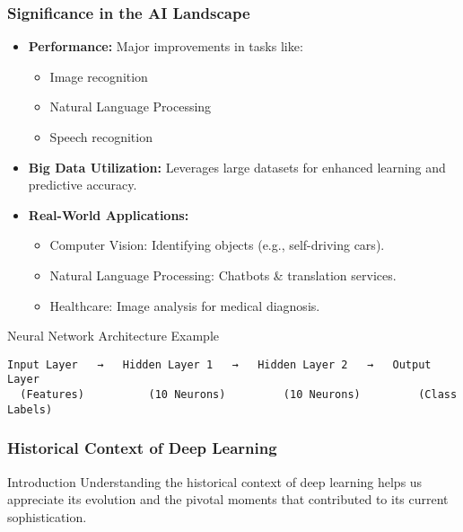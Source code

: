 \documentclass[aspectratio=169]{beamer}
\begin{document}
\begin{frame}[fragile]
    \frametitle{Significance in the AI Landscape}
    \begin{itemize}
        \item \textbf{Performance:} Major improvements in tasks like:
            \begin{itemize}
                \item Image recognition
                \item Natural Language Processing
                \item Speech recognition
            \end{itemize}
        \item \textbf{Big Data Utilization:} Leverages large datasets for enhanced learning and predictive accuracy.
        \item \textbf{Real-World Applications:}
            \begin{itemize}
                \item Computer Vision: Identifying objects (e.g., self-driving cars).
                \item Natural Language Processing: Chatbots \& translation services.
                \item Healthcare: Image analysis for medical diagnosis.
            \end{itemize}
    \end{itemize}

    \begin{block}{Neural Network Architecture Example}
    \begin{lstlisting}
Input Layer   →   Hidden Layer 1   →   Hidden Layer 2   →   Output Layer
  (Features)          (10 Neurons)         (10 Neurons)         (Class Labels)
    \end{lstlisting}
    \end{block}
\end{frame}

\begin{frame}[fragile]
    \frametitle{Historical Context of Deep Learning}
    \begin{block}{Introduction}
        Understanding the historical context of deep learning helps us appreciate its evolution and the pivotal moments that contributed to its current sophistication. 
    \end{block}
\end{frame}
\end{document}
